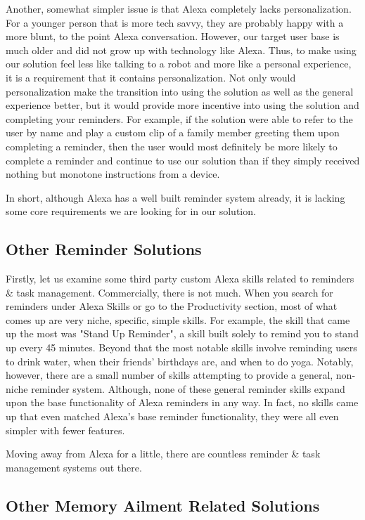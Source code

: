 \documentclass[conference]{IEEEtran}
\begin{document}
Another, somewhat simpler issue is that Alexa completely lacks personalization. 
For a younger person that is more tech savvy, they are probably happy with a more blunt, to the point Alexa conversation. 
However, our target user base is much older and did not grow up with technology like Alexa. 
Thus, to make using our solution feel less like talking to a robot and more like a personal experience, it is a requirement that it contains personalization. 
Not only would personalization make the transition into using the solution as well as the general experience better, but it would provide more incentive into using the solution and completing your reminders. 
For example, if the solution were able to refer to the user by name and play a custom clip of a family member greeting them upon completing a reminder, then the user would most definitely be more likely to complete a reminder and continue to use our solution than if they simply received nothing but monotone instructions from a device. 

In short, although Alexa has a well built reminder system already, it is lacking some core requirements we are looking for in our solution. 

\subsection{Other Reminder Solutions}

Firstly, let us examine some third party custom Alexa skills related to reminders \& task management. 
Commercially, there is not much. 
When you search for reminders under Alexa Skills or go to the Productivity section, most of what comes up are very niche, specific, simple skills. 
For example, the skill that came up the most was "Stand Up Reminder", a skill built solely to remind you to stand up every 45 minutes. 
Beyond that the most notable skills involve reminding users to drink water, when their friends' birthdays are, and when to do yoga. 
Notably, however, there are a small number of skills attempting to provide a general, non-niche reminder system. 
Although, none of these general reminder skills expand upon the base functionality of Alexa reminders in any way. 
In fact, no skills came up that even matched Alexa's base reminder functionality, they were all even simpler with fewer features. 

Moving away from Alexa for a little, there are countless reminder \& task management systems out there. 

\subsection{Other Memory Ailment Related Solutions}
\end{document}
